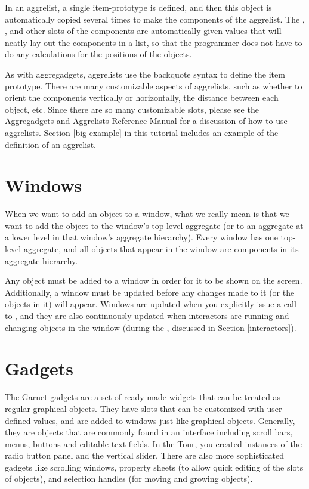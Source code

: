 In an aggrelist, a single item-prototype is defined, and then this
object is automatically copied several times to make the components of
the aggrelist.  The , , and other slots of the
components are automatically given values that will neatly lay out the
components in a list, so that the programmer does not have to do any
calculations for the positions of the objects.

As with aggregadgets, aggrelists
use the backquote syntax to define the item prototype.  There are many
customizable aspects of aggrelists, such as whether to orient the
components vertically or horizontally, the distance between each
object, etc.  Since there are so many customizable slots, please see
the Aggregadgets and Aggrelists Reference Manual for a discussion of
how to use aggrelists.  Section \ref{big-example} in this tutorial
includes an example of the definition of an aggrelist.


\section{Windows}

When we want to add an object to a window, what we really mean is that we
want to add the object to the window's top-level aggregate (or to an
aggregate at a lower level in that window's aggregate hierarchy).
Every window has one top-level aggregate, and all objects that appear
in the window are components in its aggregate hierarchy.

Any object must be added to a window in order for it to be shown on
the screen.  Additionally, a window must be updated before any changes
made to it (or the objects in it) will appear.  Windows are updated
when you explicitly issue a call to , and they are
also continuously updated when interactors are running and changing
objects in the window (during the , discussed in
Section \ref{interactors}).


\section{Gadgets}

The Garnet gadgets are a set of ready-made widgets that can be treated
as regular graphical objects.  They have slots that can be customized
with user-defined values, and are added to windows just like graphical
objects.  Generally, they are objects that are
commonly found in an interface including scroll bars, menus, buttons
and editable text fields.  In the Tour, you created instances of the
radio button panel and the vertical slider.  There are also more
sophisticated gadgets like scrolling windows, property sheets (to
allow quick editing of the slots of objects), and selection handles
(for moving and growing objects).

